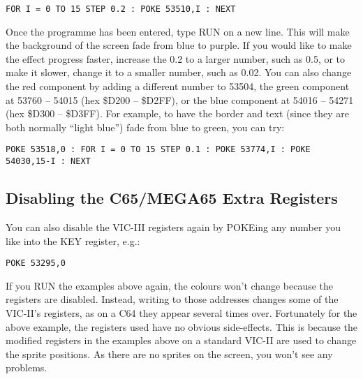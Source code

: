 \begin{tcolorbox}[colback=black,coltext=white]
\verbatimfont{\codefont}
\begin{verbatim}
FOR I = 0 TO 15 STEP 0.2 : POKE 53510,I : NEXT
\end{verbatim}
\end{tcolorbox}

Once the programme has been entered, type RUN on a new line. This will make the background of the screen fade from
blue to purple.  If you would like to make the effect progress faster, increase the 0.2 to a larger number, such as 0.5, or to
make it slower, change it to a smaller number, such as 0.02. You can also change the red component by adding a
different number to 53504, the green component at 53760 -- 54015 (hex \$D200 -- \$D2FF), or the
blue component at 54016 -- 54271 (hex \$D300 -- \$D3FF).  For example, to have
the border and text (since they are both normally ``light blue'') fade from blue to green, you can try:

\begin{tcolorbox}[colback=black,coltext=white]
\verbatimfont{\codefont}
\begin{verbatim}
POKE 53518,0 : FOR I = 0 TO 15 STEP 0.1 : POKE 53774,I : POKE 54030,15-I : NEXT
\end{verbatim}
\end{tcolorbox}

\subsection{Disabling the C65/MEGA65 Extra Registers}

You can also disable the VIC-III registers again by POKEing any number you like into the KEY register, e.g.:

\begin{tcolorbox}[colback=black,coltext=white]
\verbatimfont{\codefont}
\begin{verbatim}
POKE 53295,0
\end{verbatim}
\end{tcolorbox}

If you RUN the examples above again, the colours won't change because
the registers are disabled. Instead, writing to those addresses changes some of the VIC-II's registers,
as on a C64 they appear several times over.  Fortunately for the above example, the registers used have no obvious
side-effects. This is because the modified registers in the examples above on a standard VIC-II are used to change the
sprite positions. As there are no sprites on the screen, you won't see any problems.

